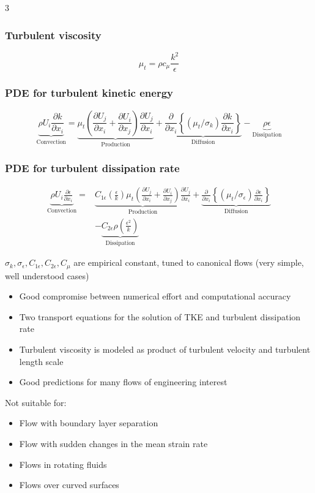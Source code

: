 \documentclass[landscape, a4paper]{article}
\begin{document}
\begin{multicols*}{3}
\subsubsection{Turbulent viscosity}
\[
  \mu_t = \rho c_\mu \frac{k^2}{\epsilon}
\]

\subsubsection{PDE for turbulent kinetic energy}
\[
  \underbrace{\rho U_i\frac{\partial k}{\partial x_i}}_{\text{Convection}}
  = \underbrace{\mu_t\left(
      \frac{\partial U_j}{\partial x_i}+\frac{\partial U_i}{\partial x_j}
    \right)\frac{\partial U_j}{\partial x_i}}_{\text{Production}}
  + \underbrace{\frac{\partial}{\partial x_i}\left\{
      (\mu_t/\sigma_k)\frac{\partial k}{\partial x_i}
    \right\}}_{\text{Diffusion}}
  - \underbrace{\rho\epsilon}_{\text{Dissipation}}
\]

\subsubsection{PDE for turbulent dissipation rate}
\[\begin{aligned}
    \underbrace{\rho U_i\frac{\partial\epsilon}{\partial x_i}}_{\text{Convection}}
  = &\underbrace{C_{1\epsilon}\left(\frac{\epsilon}{k}\right)\mu_t\left(
      \frac{\partial U_j}{\partial x_i}+\frac{\partial U_i}{\partial x_j}
    \right)\frac{\partial U_j}{\partial x_i}}_{\text{Production}}
  + \underbrace{\frac{\partial}{\partial x_i}\left\{
      (\mu_t/\sigma_\epsilon)\frac{\partial\epsilon}{\partial x_i}
    \right\}}_{\text{Diffusion}}\\
  &- \underbrace{C_{2\epsilon}\rho\left(\frac{\epsilon^2}{k}\right)}_{\text{Dissipation}}
\end{aligned}
\]

$\sigma_k,\sigma_\epsilon,C_{1\epsilon},C_{2\epsilon},C_\mu$ are empirical constant, tuned to canonical flows (very simple, well understood cases)

\begin{itemize}
  \item Good compromise between numerical effort and computational accuracy
  \item Two transport equations for the solution of TKE and turbulent dissipation rate
  \item Turbulent viscosity is modeled as product of turbulent velocity and turbulent length scale
  \item Good predictions for many flows of engineering interest
\end{itemize}
Not suitable for:
\begin{itemize}
  \item Flow with boundary layer separation
  \item Flow with sudden changes in the mean strain rate
  \item Flows in rotating fluids
  \item Flows over curved surfaces
\end{itemize}


\end{multicols*}
\end{document}
